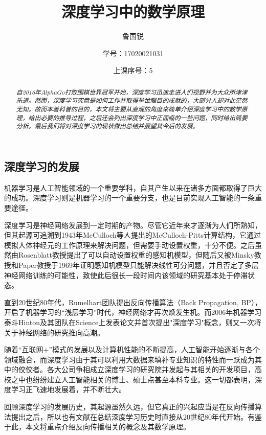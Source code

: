 \documentclass[UTF8,a4paper]{ctexart}
\title{深度学习中的数学原理}
\author{鲁国锐 \protect\newline
\and 学号：17020021031 \\
\and 上课序号：5}
\begin{document}
\maketitle

\begin{multicols}{2}

	\begin{abstract}
		\indent \textit{自2016年$AlphaGo$打败围棋世界冠军开始，深度学习迅速走进人们视野并为大众所津津乐道。然而，深度学习究竟是如何工作并取得举世瞩目的成就的，大部分人却对此茫然无知。故而本着科普的目的，本文将主要从直观的角度来简单介绍深度学习中的数学原理，给出必要的推导过程，之后还会列出深度学习中正面临的一些问题，同时给出简要分析。最后我们将对深度学习的现状做出总结并展望其今后的发展。}
	\end{abstract}
		\section{深度学习的发展}
		\indent 机器学习是人工智能领域的一个重要学科，自其产生以来在诸多方面都取得了巨大的成功。深度学习则是机器学习的一个重要分支，也是目前实现人工智能的一条重要途径。
		
		\indent 深度学习是神经网络发展到一定时期的产物\cite{付文博2018深度学习原理及应用综述}。尽管它近年来才逐渐为人们所熟知，但其起源可追溯到1943年McCulloch等人\cite{Warren1943A}提出的McCulloch-Pitts计算结构，它通过模拟人体神经元的工作原理来解决问题，但需要手动设置权重，十分不便。之后虽然由Rosenblatt教授\cite{Rosenblatt1958Two}提出了可以自动设置权重的感知机模型，但随后又被Minsky教授和Paper教授于1969年证明感知机模型只能解决线性可分问题，并且否定了多层神经网络训练的可能性\cite{Casper1988Perceptrons}，致使此后很长一段时间内该领域的研究基本处于停滞状态。
		
		\indent 直到20世纪80年代，Rumelhart团队提出反向传播算法（Back Propagation, BP）\cite{Rumelhart1986Learning}，开启了机器学习的“浅层学习”时代\cite{yukai}，神经网络才再次焕发生机。而2006年机器学习泰斗Hinton及其团队在Science上发表论文并首次提出"深度学习"概念\cite{Hinton2006Reducing}，则又一次将关于神经网络的研究推向高潮。
		
		\indent 随着“互联网+”模式的发展以及计算机性能的不断提高，人工智能开始逐渐与各个领域融合，而深度学习由于其可以利用大数据来填补专业知识的特性而一跃成为其中的佼佼者。各大公司争相成立深度学习的研究院并发起与其相关的开发项目，高校之中也纷纷建立人工智能相关的博士、硕士点甚至本科专业。这一切都表明，深度学习正飞速地发展着，并不断壮大。
		
		\indent 回顾深度学习的发展历史，其起源虽然久远，但它真正的兴起应当是在反向传播算法提出之后，所以也有文献在总结深度学习历史时直接从20世纪80年代开始\cite{yukai}。有鉴于此，本文将重点介绍反向传播相关的概念及其数学原理。


\end{multicols}
\end{document}
